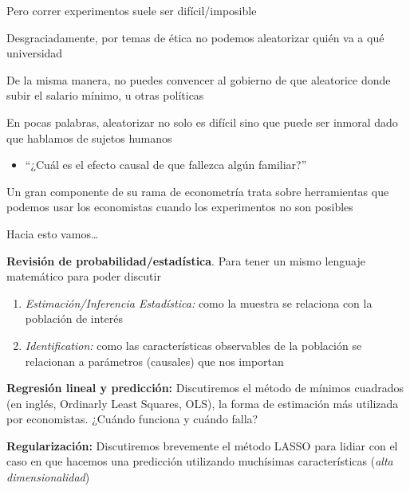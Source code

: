 \documentclass[11pt,handout,aspectratio=169]{beamer}
\newenvironment{wideitemize}{\itemize\addtolength{\itemsep}{10pt}}{\enditemize}
\begin{document}
\begin{frame}{Pero correr experimentos suele ser difícil/imposible}
	\begin{wideitemize}
	
	\item
	Desgraciadamente, por temas de ética no podemos aleatorizar quién va a qué universidad

	\item
	De la misma manera, no puedes convencer al gobierno de que aleatorice donde subir el salario mínimo, u otras políticas
	
	\item
En pocas palabras, aleatorizar no solo es difícil sino que puede ser inmoral dado que hablamos de sujetos humanos
	
		\begin{itemize}
			\item 
			``¿Cuál es el efecto causal de que fallezca algún familiar?''
		\end{itemize}	
	
	\pause
	\item
	Un gran componente de su rama de econometría trata sobre herramientas que podemos usar los economistas cuando los experimentos no son posibles
	\end{wideitemize}
\end{frame}

\begin{frame}{Hacia esto vamos\dots}
	\begin{wideitemize}
		\item
		\textbf{Revisión de probabilidad/estadística}. Para tener un mismo lenguaje matemático para poder discutir
		
			\begin{enumerate}
				\item 
				\textit{Estimación/Inferencia Estadística: }como la muestra se relaciona con la población de interés
				
				\item
				\textit{Identification:} como las características observables de la población se relacionan a parámetros (causales) que nos importan
			\end{enumerate}
		\pause 
		
		\item
		\textbf{Regresión lineal y predicción: }Discutiremos el método de mínimos cuadrados (en inglés, Ordinarly Least Squares, OLS), la forma de estimación más utilizada por economistas. ¿Cuándo funciona y cuándo falla?
		
		\pause
		\item
		\textbf{Regularización: }Discutiremos brevemente el método LASSO para lidiar con el caso en que hacemos una predicción utilizando muchísimas características (\textit{alta dimensionalidad})
			 
	\end{wideitemize}
\end{frame}
\end{document}
